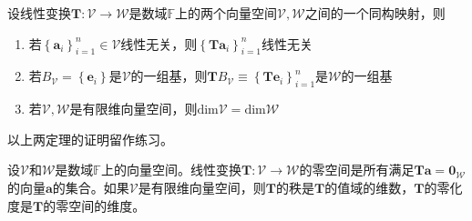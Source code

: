 \documentclass[main.tex]{subfiles}
\begin{document}
\begin{theorem}
设线性变换$\mathbf{T}:\mathcal{V}\rightarrow\mathcal{W}$是数域$\mathbb{F}$上的两个向量空间$\mathcal{V},\mathcal{W}$之间的一个同构映射，则
\begin{enumerate}
    \item 若$\left\{\mathbf{a}_i\right\}_{i=1}^n\in\mathcal{V}$线性无关，则$\left\{\mathbf{Ta}_i\right\}_{i=1}^n$线性无关
    \item 若$B_\mathcal{V}=\left\{\mathbf{e}_i\right\}$是$\mathcal{V}$的一组基，则$\mathbf{T}B_\mathcal{V}\equiv\left\{\mathbf{Te}_i\right\}_{i=1}^n$是$\mathcal{W}$的一组基
    \item 若$\mathcal{V},\mathcal{W}$是有限维向量空间，则$\mathrm{dim}\mathcal{V}=\mathrm{dim}\mathcal{W}$
\end{enumerate}
\end{theorem}

以上两定理的证明留作练习。

\begin{definition}\label{def:II.4.4}
设$\mathcal{V}$和$\mathcal{W}$是数域$\mathbb{F}$上的向量空间。线性变换$\mathbf{T}:\mathcal{V}\rightarrow\mathcal{W}$的零空间是所有满足$\mathbf{Ta}=\mathbf{0}_\mathcal{W}$的向量$\mathbf{a}$的集合。如果$\mathcal{V}$是有限维向量空间，则$\mathbf{T}$的秩是$\mathbf{T}$的值域的维数，$\mathbf{T}$的零化度是$\mathbf{T}$的零空间的维度。
\end{definition}
\end{document}
